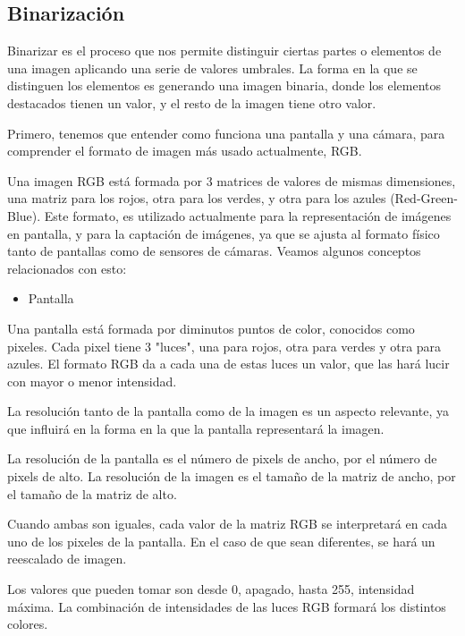 \subsection{Binarización}
Binarizar es el proceso que nos permite distinguir ciertas partes o elementos de una imagen aplicando una serie de valores umbrales. La forma en la que se distinguen los elementos es generando una imagen binaria, donde los elementos destacados tienen un valor, y el resto de la imagen tiene otro valor.

Primero, tenemos que entender como funciona una pantalla y una cámara, para comprender el formato de imagen más usado actualmente, RGB.

Una imagen RGB está formada por 3 matrices de valores de mismas dimensiones, una matriz para los rojos, otra para los verdes, y otra para los azules (Red-Green-Blue). Este formato, es utilizado actualmente para la representación de imágenes en pantalla, y para la captación de imágenes, ya que se ajusta al formato físico tanto de pantallas como de sensores de cámaras.
Veamos algunos conceptos relacionados con esto:

\begin{itemize}

	\item Pantalla
	
\end{itemize}

Una pantalla está formada por diminutos puntos de color, conocidos como pixeles. Cada pixel tiene 3 "luces", una para rojos, otra para verdes y otra para azules. El formato RGB da a cada una de estas luces un valor, que las hará lucir con mayor o menor intensidad.

La resolución tanto de la pantalla como de la imagen es un aspecto relevante, ya que influirá en la forma en la que la pantalla representará la imagen.
 
La resolución de la pantalla es el número de pixels de ancho, por el número de pixels de alto. La resolución de la imagen es el tamaño de la matriz de ancho, por el tamaño de la matriz de alto.

Cuando ambas son iguales, cada valor de la matriz RGB se interpretará en cada uno de los pixeles de la pantalla. En el caso de que sean diferentes, se hará un reescalado de imagen.

Los valores que pueden tomar son desde 0, apagado, hasta 255, intensidad máxima. La combinación de intensidades de las luces RGB formará los distintos colores. 

